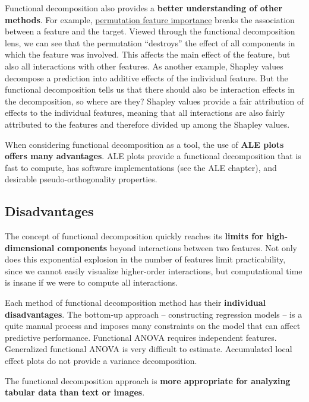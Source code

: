 \documentclass[
  10pt,
]{scrbook}
\begin{document}
Functional decomposition also provides a \textbf{better understanding of other methods}.
For example, \protect\hyperlink{feature-importance}{permutation feature importance} breaks the association between a feature and the target.
Viewed through the functional decomposition lens, we can see that the permutation ``destroys'' the effect of all components in which the feature was involved.
This affects the main effect of the feature, but also all interactions with other features.
As another example, Shapley values decompose a prediction into additive effects of the individual feature.
But the functional decomposition tells us that there should also be interaction effects in the decomposition, so where are they?
Shapley values provide a fair attribution of effects to the individual features, meaning that all interactions are also fairly attributed to the features and therefore divided up among the Shapley values.

When considering functional decomposition as a tool, the use of \textbf{ALE plots offers many advantages}.
ALE plots provide a functional decomposition that is fast to compute, has software implementations (see the ALE chapter), and desirable pseudo-orthogonality properties.

\hypertarget{disadvantages-8}{%
\subsection{Disadvantages}\label{disadvantages-8}}

The concept of functional decomposition quickly reaches its \textbf{limits for high-dimensional components} beyond interactions between two features.
Not only does this exponential explosion in the number of features limit practicability, since we cannot easily visualize higher-order interactions, but computational time is insane if we were to compute all interactions.

Each method of functional decomposition method has their \textbf{individual disadvantages}.
The bottom-up approach -- constructing regression models -- is a quite manual process and imposes many constraints on the model that can affect predictive performance.
Functional ANOVA requires independent features.
Generalized functional ANOVA is very difficult to estimate.
Accumulated local effect plots do not provide a variance decomposition.

The functional decomposition approach is \textbf{more appropriate for analyzing tabular data than text or images}.
\end{document}
